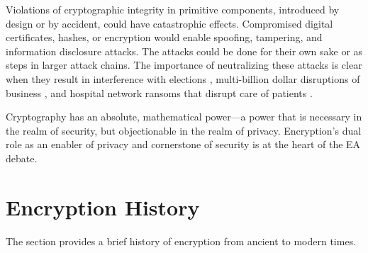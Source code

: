 
Violations of cryptographic integrity in primitive components, introduced by design or by accident, could have
catastrophic effects. Compromised digital certificates, hashes, or encryption would enable spoofing, tampering, and
information disclosure attacks. The attacks could be done for their own sake or as steps in larger attack chains. The
importance of neutralizing these attacks is clear when they result in interference with elections \cite{mueller_2018},
multi-billion dollar disruptions of business \cite{greenberg_2018_notpetya}, and hospital network ransoms that disrupt
care of patients \cite{goodin_ransomware_2019}.


Cryptography has an absolute, mathematical power---a power that is necessary in the realm of security, but objectionable
in the realm of privacy. Encryption's dual role as an enabler of privacy and cornerstone of security is at the heart of
the EA debate.


\section{Encryption History}
\label{sec-crypto-history}

The section provides a brief history of encryption from ancient to modern times.

